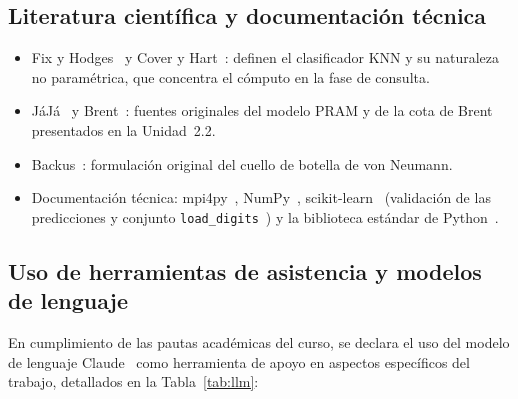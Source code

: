 \documentclass[11pt,a4paper]{article}
\begin{document}
\subsection{Literatura científica y documentación técnica}
\begin{itemize}
  \item Fix y Hodges~\cite{fix1951} y Cover y Hart~\cite{cover1967}: definen el clasificador KNN y su
        naturaleza no paramétrica, que concentra el cómputo en la fase de consulta.
  \item JáJá~\cite{jaja1992} y Brent~\cite{brent1974}: fuentes originales del modelo PRAM y de la
        cota de Brent presentados en la Unidad~2.2.
  \item Backus~\cite{backus1978}: formulación original del cuello de botella de von Neumann.
  \item Documentación técnica: mpi4py~\cite{mpi4pydoc,dalcin2021}, NumPy~\cite{harris2020},
        scikit-learn~\cite{pedregosa2011} (validación de las predicciones y conjunto
        \texttt{load\_digits}~\cite{alpaydin1998}) y la biblioteca estándar de
        Python~\cite{pythoncounter}.
\end{itemize}

\subsection{Uso de herramientas de asistencia y modelos de lenguaje}
En cumplimiento de las pautas académicas del curso, se declara el uso del modelo de lenguaje
Claude~\cite{claude} como herramienta de apoyo en aspectos específicos del trabajo, detallados en la
Tabla~\ref{tab:llm}:
\end{document}
